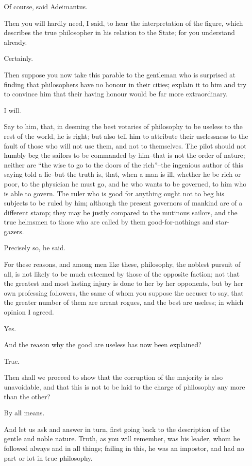Of course, said Adeimantus.

Then you will hardly need, I said, to hear the interpretation of the
figure, which describes the true philosopher in his relation to the
State; for you understand already.

Certainly.

Then suppose you now take this parable to the gentleman who is surprised
at finding that philosophers have no honour in their cities; explain
it to him and try to convince him that their having honour would be far
more extraordinary.

I will.

Say to him, that, in deeming the best votaries of philosophy to be
useless to the rest of the world, he is right; but also tell him to
attribute their uselessness to the fault of those who will not use them,
and not to themselves. The pilot should not humbly beg the sailors to be
commanded by him--that is not the order of nature; neither are ``the wise
to go to the doors of the rich''--the ingenious author of this saying
told a lie--but the truth is, that, when a man is ill, whether he
be rich or poor, to the physician he must go, and he who wants to
be governed, to him who is able to govern. The ruler who is good for
anything ought not to beg his subjects to be ruled by him; although
the present governors of mankind are of a different stamp; they may be
justly compared to the mutinous sailors, and the true helmsmen to those
who are called by them good-for-nothings and star-gazers.

Precisely so, he said.

For these reasons, and among men like these, philosophy, the noblest
pursuit of all, is not likely to be much esteemed by those of the
opposite faction; not that the greatest and most lasting injury is done
to her by her opponents, but by her own professing followers, the same
of whom you suppose the accuser to say, that the greater number of them
are arrant rogues, and the best are useless; in which opinion I agreed.

Yes.

And the reason why the good are useless has now been explained?

True.

Then shall we proceed to show that the corruption of the majority is
also unavoidable, and that this is not to be laid to the charge of
philosophy any more than the other?

By all means.

And let us ask and answer in turn, first going back to the description
of the gentle and noble nature. Truth, as you will remember, was his
leader, whom he followed always and in all things; failing in this, he
was an impostor, and had no part or lot in true philosophy.

